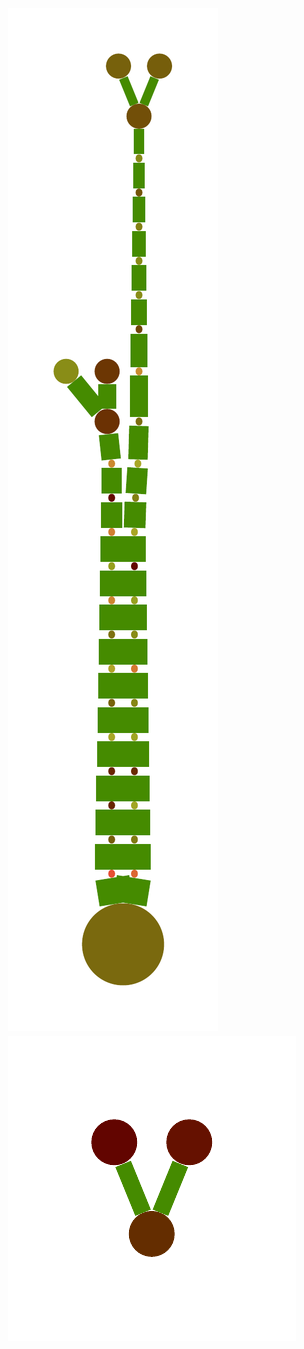 \documentclass[a4paper,10pt]{article}
\begin{document}
\begin{figure}
{    \includegraphics[scale=.16]{./figures/6-5-tree-induced-10.pdf}
    \includegraphics[scale=.16]{./figures/6-5-tree-induced-14.pdf}
}
\end{figure}
\end{document}
